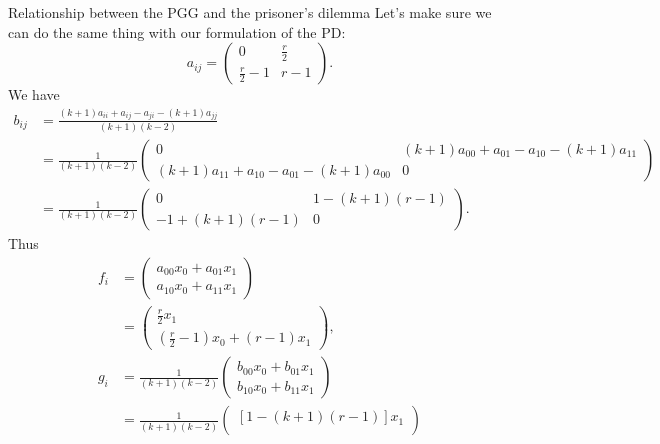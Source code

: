 \documentclass[13pt]{amsart}
\begin{document}
\begin{section}{Relationship between the PGG and the prisoner's dilemma}
Let's make sure we can do the same thing with our formulation of the PD:
\begin{equation}
    a_{ij} =
    \begin{pmatrix}
        0 & \frac{r}{2} \\
        \frac{r}{2} - 1 & r - 1
    \end{pmatrix}.
\end{equation}
We have
\begin{equation}
    \begin{split}
        b_{ij} & =
        \frac{(k+1)a_{ii} + a_{ij} - a_{ji} - (k+1)a_{jj}}{(k+1)(k-2)}
        \\
        & = \frac{1}{(k+1)(k-2)}
        \begin{pmatrix}
            0 & (k+1)a_{00} + a_{01} - a_{10} - (k+1)a_{11} \\
            (k+1)a_{11} + a_{10} - a_{01} - (k+1)a_{00} & 0
        \end{pmatrix}
        \\
        & = \frac{1}{(k+1)(k-2)}
        \begin{pmatrix}
            0 & 1 - (k+1)(r-1) \\
            -1 + (k+1)(r-1) & 0
        \end{pmatrix}.
    \end{split}
\end{equation}
Thus
\begin{equation}
    \begin{split}
        f_i & =
        \begin{pmatrix}
            a_{00}x_0 + a_{01}x_1 \\
            a_{10}x_0 + a_{11}x_1
        \end{pmatrix}
        \\
        & =
        \begin{pmatrix}
            \frac{r}{2}x_1 \\
            (\frac{r}{2} - 1)x_0 + (r-1) x_1
        \end{pmatrix},
        \\
        g_i & = \frac{1}{(k+1)(k-2)}
        \begin{pmatrix}
            b_{00}x_0 + b_{01}x_1\\
            b_{10}x_0 + b_{11}x_1
        \end{pmatrix}
        \\
        & = \frac{1}{(k+1)(k-2)}
        \begin{pmatrix}
            [1 - (k+1)(r-1)]x_1\\

\end{pmatrix}
\end{split}
\end{equation}
\end{section}
\end{document}
